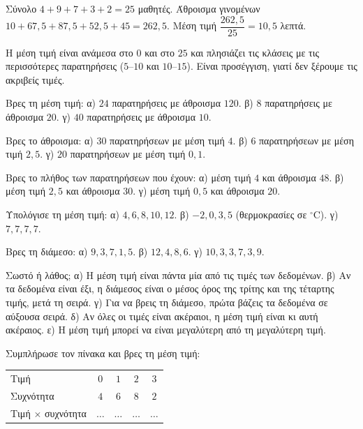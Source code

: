 \apantisi Σύνολο $4+9+7+3+2=25$ μαθητές. Άθροισμα γινομένων $10+67{,}5+87{,}5+52{,}5+45=262{,}5$. Μέση τιμή $\dfrac{262{,}5}{25}=10{,}5$ λεπτά.\par
\elegxos Η μέση τιμή είναι ανάμεσα στο $0$ και στο $25$ και πλησιάζει τις κλάσεις με τις περισσότερες παρατηρήσεις ($5$--$10$ και $10$--$15$). Είναι προσέγγιση, γιατί δεν ξέρουμε τις ακριβείς τιμές.



\ex Βρες τη μέση τιμή: α) $24$ παρατηρήσεις με άθροισμα $120$. β) $8$ παρατηρήσεις με άθροισμα $20$. γ) $40$ παρατηρήσεις με άθροισμα $10$.

\ex Βρες το άθροισμα: α) $30$ παρατηρήσεων με μέση τιμή $4$. β) $6$ παρατηρήσεων με μέση τιμή $2{,}5$. γ) $20$ παρατηρήσεων με μέση τιμή $0{,}1$.

\ex Βρες το πλήθος των παρατηρήσεων που έχουν: α) μέση τιμή $4$ και άθροισμα $48$. β) μέση τιμή $2{,}5$ και άθροισμα $30$. γ) μέση τιμή $0{,}5$ και άθροισμα $20$.

\ex Υπολόγισε τη μέση τιμή: α) $4, 6, 8, 10, 12$. β) $-2, 0, 3, 5$ (θερμοκρασίες σε $^\circ$C). γ) $7, 7, 7, 7$.

\ex Βρες τη διάμεσο: α) $9, 3, 7, 1, 5$. β) $12, 4, 8, 6$. γ) $10, 3, 3, 7, 3, 9$.

\ex Σωστό ή λάθος; α) Η μέση τιμή είναι πάντα μία από τις τιμές των δεδομένων. β) Αν τα δεδομένα είναι έξι, η διάμεσος είναι ο μέσος όρος της τρίτης και της τέταρτης τιμής, μετά τη σειρά. γ) Για να βρεις τη διάμεσο, πρώτα βάζεις τα δεδομένα σε αύξουσα σειρά. δ) Αν όλες οι τιμές είναι ακέραιοι, η μέση τιμή είναι κι αυτή ακέραιος. ε) Η μέση τιμή μπορεί να είναι μεγαλύτερη από τη μεγαλύτερη τιμή.

\ex Συμπλήρωσε τον πίνακα και βρες τη μέση τιμή: \par
\begin{center}
\renewcommand{\arraystretch}{1.25}
\begin{tabular}{lcccc}
\toprule
Τιμή & $0$ & $1$ & $2$ & $3$\\
Συχνότητα & $4$ & $6$ & $8$ & $2$\\
Τιμή $\times$ συχνότητα & $\ldots$ & $\ldots$ & $\ldots$ & $\ldots$\\
\bottomrule
\end{tabular}
\end{center}


